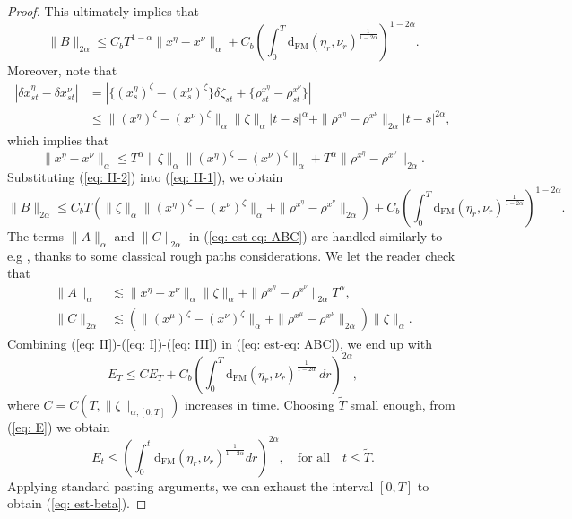 \documentclass[12pt,reqno]{amsart}
\numberwithin{equation}{section}  %
\newcommand{\1}{{\bf 1}}
\newcommand{\2}{{\bf 2}}
\newcommand{\lp}{\left(}
\newcommand{\rp}{\right)}
\theoremstyle{remark}
\theoremstyle{remark}
\begin{document}
\begin{proof}
This ultimately implies that 
\begin{equation} \label{eq: II-1}\|B\|_{2\alpha}\leq C_{b}T^{1-\alpha}\|x^{\eta}-{x}^{\nu}\|_{\alpha}+C_{b}\lp \int_{0}^{T}\mathrm{d_{FM}}(\eta_{r},\nu_{r})^{\frac{1}{1-2\alpha}} \rp^{1-2\alpha}.
\end{equation}
Moreover, note that
\begin{align*}|\delta x^{\eta}_{st}- \delta {x}^{\nu}_{st}|&=|\{ (x_{s}^{\eta})^{\zeta}-({x}^{\nu}_{s})^{\zeta}\} \delta \zeta_{st} + \{\rho^{x^{\eta}}_{st}-\rho^{{x}^{\nu}}_{st}\}|\\
&\leq \|(x^{\eta})^{\zeta}-({x}^{\nu})^{\zeta}\|_{\alpha}\|\zeta\|_{\alpha}|t-s|^{\alpha} +\|\rho^{x^{\eta}}-\rho^{{x}^{\nu}}\|_{2\alpha}|t-s|^{2\alpha}, \end{align*}
which implies that
\begin{equation}\label{eq: II-2}
\|x^{\eta}-{x}^{\nu}\|_{\alpha}
\leq 
T^{\alpha}\|\zeta\|_{\alpha}\|(x^{\eta})^{\zeta}-({x}^{\nu})^{\zeta}\|_{\alpha}
+ T^{\alpha}\|\rho^{x^{\eta}}-\rho^{{x}^{\nu}}\|_{2\alpha}.\end{equation}
Substituting (\ref{eq: II-2}) into (\ref{eq: II-1}), we obtain
\begin{equation}\label{eq: II}
    \|B\|_{2\alpha} 
    \leq 
    C_{b}T\lp \|\zeta\|_{\alpha}\|(x^{\eta})^{\zeta}-(x^{\nu})^{\zeta}\|_{\alpha} 
    + \|\rho^{x^{\eta}}-\rho^{x^{\nu}}\|_{2\alpha}\rp 
    +C_{b}\lp\int_{0}^{T} \mathrm{d_{FM}}(\eta_{r},\nu_{r})^{\frac{1}{1-2\alpha}} \rp^{1-2\alpha}.
\end{equation}
The terms $\|A\|_{\alpha}$ and $\|C\|_{2\alpha}$ in (\ref{eq: est-eq: ABC}) are handled similarly to e.g \cite[Chapter 11]{friz-victoir},  thanks to some classical rough paths considerations. We let the reader check that
\begin{align}\label{eq: I}
    \|A\|_{\alpha}&\lesssim \|x^{\eta}-{x}^{\nu}\|_{\alpha}\|\zeta\|_{\alpha}+ \|\rho^{x^{\eta}}-\rho^{{x}^{\nu}}\|_{2\alpha}T^{\alpha},\\
\label{eq: III}
    \|C\|_{2\alpha}&\lesssim \lp\|(x^{\mu})^{\zeta}-({x}^{\nu})^{\zeta}\|_{\alpha}+\|\rho^{x^{\mu}}-\rho^{{x}^{\nu}}\|_{2\alpha} \rp \|\zeta\|_{\alpha}.
\end{align}
Combining (\ref{eq: II})-(\ref{eq: I})-(\ref{eq: III}) in (\ref{eq: est-eq: ABC}), we end up with 
\begin{equation} \label{eq: E}
    E_{T}\leq C E_{T} +C_{b}\lp\int_{0}^{T}\mathrm{d_{FM}}(\eta_{r},\nu_{r})^{\frac{1}{1-2\alpha}}\,dr \rp^{2\alpha},
\end{equation}
where $C=C(T,\|\zeta\|_{\alpha;[0,T]})$ increases in time. Choosing $\tilde{T}$ small enough, from (\ref{eq: E}) we obtain
\begin{equation}
    E_{t}\leq \lp \int_{0}^{t}\mathrm{d_{FM}}(\eta_{r},\nu_{r})^{\frac{1}{1-2\alpha}}dr \rp ^{2\alpha}, \quad \text{for all}\quad t\leq \tilde{T}.
\end{equation}
Applying standard pasting arguments, we can exhaust the interval $[0,T]$ to obtain (\ref{eq: est-beta}).
\end{proof}
\end{document}
